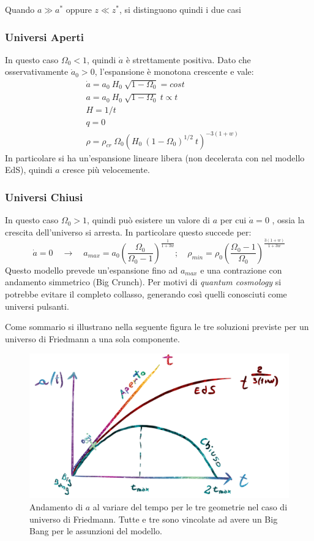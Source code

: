 Quando $a\gg a^*$ oppure $z\ll z^*$, si distinguono quindi i due casi

\subsubsection{Universi Aperti}
In questo caso $\Omega_0 < 1$, quindi $\dot{a}$ è strettamente positiva. Dato che osservativamente $\dot{a}_0 >0$, l'espansione è monotona crescente e vale:
\begin{align}
   & \dot{a}=a_0~ H_0 ~ \sqrt{1-\Omega_0 }=cost \\
   & a=a_0~ H_0 ~ \sqrt{1-\Omega_0 }~ t  \propto t \\
   & H= 1/t \\
   & q= 0 \\
   & \rho =\rho_{cr} ~\Omega_0 \left ( H_0  ~(1-\Omega_0)^{1/2} ~ t   \right )^{-3(1+w)}
\end{align}
In particolare si ha un'espansione lineare libera (non decelerata con nel modello EdS), quindi $a$ cresce più velocemente. 

\subsubsection{Universi Chiusi}
In questo caso $\Omega_0 > 1$, quindi può esistere un valore di $a$ per cui $\dot{a}=0$ , ossia la crescita dell'universo si arresta. In particolare questo succede per:
$$
\dot{a}=0 \quad \rightarrow \quad a_{max}=a_0 \left ( \frac{\Omega_0}{\Omega_0 -1} \right )^{\frac{1}{1+3w}}; \quad \rho_{min}=\rho_0 \left ( \frac{\Omega_0 -1}{\Omega_0} \right )^{\frac{3(1+w)}{1+3w}}
$$
Questo modello prevede un'espansione fino ad $a_{max}$ e una contrazione con andamento simmetrico (Big Crunch). Per motivi di \textit{quantum cosmology} si potrebbe evitare il completo collasso, generando così quelli conosciuti come universi pulsanti. 

Come sommario si illustrano nella seguente figura le tre soluzioni previste per un universo di Friedmann a una sola componente.
\begin{figure}[ht]
    \centering
    \includegraphics[width=.8\textwidth]{Pictures/2/modellia-t.png}
    \caption{Andamento di $a$ al variare del tempo per le tre geometrie nel caso di universo di Friedmann. Tutte e tre sono vincolate ad avere un Big Bang per le assunzioni del modello.}
    \label{fig:2at}
\end{figure}

